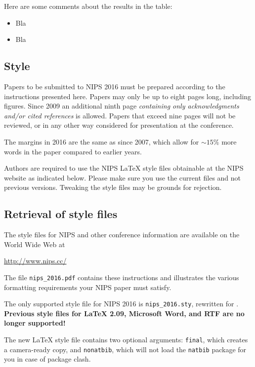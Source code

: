 \documentclass{article}
\begin{document}
Here are some comments about the results in the table:
\begin{itemize}
  \item Bla
  \item Bla
\end{itemize}


\subsection{Style}

Papers to be submitted to NIPS 2016 must be prepared according to the
instructions presented here. Papers may only be up to eight pages
long, including figures. Since 2009 an additional ninth page
\emph{containing only acknowledgments and/or cited references} is
allowed. Papers that exceed nine pages will not be reviewed, or in any
other way considered for presentation at the conference.

The margins in 2016 are the same as since 2007, which allow for
$\sim$$15\%$ more words in the paper compared to earlier years.

Authors are required to use the NIPS \LaTeX{} style files obtainable
at the NIPS website as indicated below. Please make sure you use the
current files and not previous versions. Tweaking the style files may
be grounds for rejection.

\subsection{Retrieval of style files}

The style files for NIPS and other conference information are
available on the World Wide Web at
\begin{center}
  \url{http://www.nips.cc/}
\end{center}
The file \verb+nips_2016.pdf+ contains these instructions and
illustrates the various formatting requirements your NIPS paper must
satisfy.

The only supported style file for NIPS 2016 is \verb+nips_2016.sty+,
rewritten for \LaTeXe{}.  \textbf{Previous style files for \LaTeX{}
  2.09, Microsoft Word, and RTF are no longer supported!}

The new \LaTeX{} style file contains two optional arguments:
\verb+final+, which creates a camera-ready copy, and \verb+nonatbib+,
which will not load the \verb+natbib+ package for you in case of
package clash.
\end{document}
